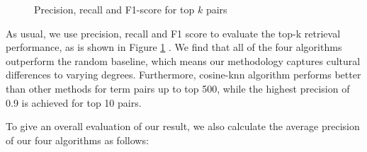 \begin{figure}[th]
\hfill
{}\hfill
{}
\caption{Precision, recall and F1-score for top $k$ pairs}
\label{fig:results}
\end{figure}

As usual, we use precision, recall and F1 score to evaluate the 
top-k retrieval performance, as is shown in Figure \ref{fig:results} . We find that all of the four algorithms outperform the random baseline, which means our methodology captures 
cultural differences to varying degrees. Furthermore, 
cosine-knn algorithm performs better than other methods
for term pairs up to top 500, while the highest precision of
0.9 is achieved for top 10 pairs. 

To give an overall evaluation of our result, we also calculate the average precision of our four algorithms as follows: 

